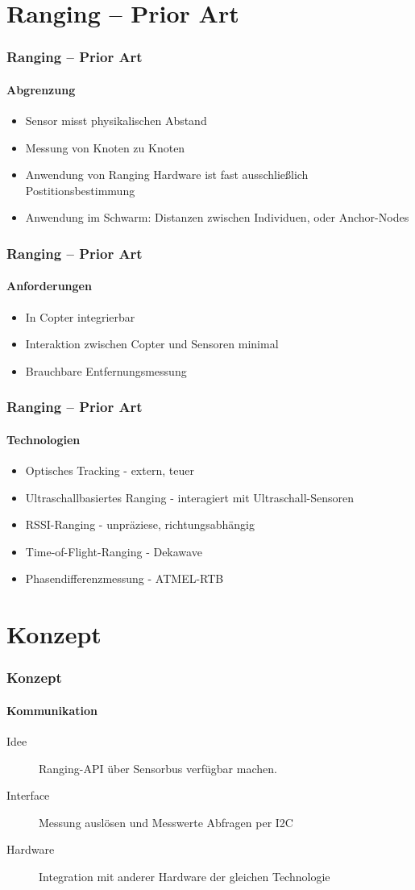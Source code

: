 \documentclass{beamer}
\begin{document}
\section{Ranging – Prior Art}
\begin{frame}
	\frametitle{Ranging – Prior Art}
	\framesubtitle{Abgrenzung}
	\begin{itemize}
		\item Sensor misst physikalischen Abstand
		\item Messung von Knoten zu Knoten
		\item Anwendung von Ranging Hardware ist fast ausschließlich Postitionsbestimmung
		\item Anwendung im Schwarm: Distanzen zwischen Individuen, oder Anchor-Nodes
	\end{itemize}
\end{frame}

\begin{frame}
	\frametitle{Ranging – Prior Art}
	\framesubtitle{Anforderungen}
	\begin{itemize}
		\item In Copter integrierbar 
		\item Interaktion zwischen Copter und Sensoren minimal
		\item Brauchbare Entfernungsmessung
	\end{itemize}
\end{frame}

\begin{frame}
	\frametitle{Ranging – Prior Art}
	\framesubtitle{Technologien}
	\begin{itemize}
		\item Optisches Tracking - extern, teuer
		\item Ultraschallbasiertes Ranging - interagiert mit Ultraschall-Sensoren
		\item RSSI-Ranging - unpräziese, richtungsabhängig
	\end{itemize}
	\begin{itemize}
		\item Time-of-Flight-Ranging - Dekawave
		\item Phasendifferenzmessung - ATMEL-RTB
	\end{itemize}
\end{frame}

\section{Konzept}
\begin{frame}
	\frametitle{Konzept}
	\framesubtitle{Kommunikation}

	\begin{description}
		\item[ Idee ] Ranging-API über Sensorbus verfügbar machen.
		\item[ Interface ] Messung auslösen und Messwerte Abfragen per I2C
		\item[ Hardware ] Integration mit anderer Hardware der gleichen Technologie
	\end{description}
\end{frame}
\end{document}
